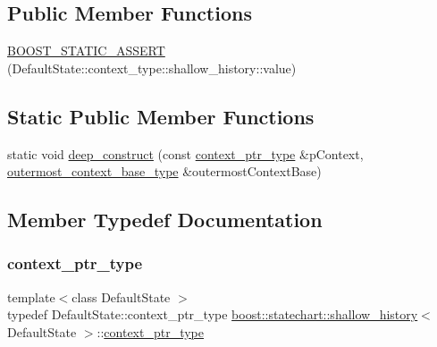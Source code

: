 \subsection*{Public Member Functions}
\begin{DoxyCompactItemize}
\item 
\mbox{\hyperlink{classboost_1_1statechart_1_1shallow__history_a52c6d3296a0c63266044bf135a9cc5e3}{B\+O\+O\+S\+T\+\_\+\+S\+T\+A\+T\+I\+C\+\_\+\+A\+S\+S\+E\+RT}} (Default\+State\+::context\+\_\+type\+::shallow\+\_\+history\+::value)
\end{DoxyCompactItemize}
\subsection*{Static Public Member Functions}
\begin{DoxyCompactItemize}
\item 
static void \mbox{\hyperlink{classboost_1_1statechart_1_1shallow__history_af903cba949c3ff7becebca038e27cef6}{deep\+\_\+construct}} (const \mbox{\hyperlink{classboost_1_1statechart_1_1shallow__history_a6433a73f2c4b7e7c42e2e2618c0ff784}{context\+\_\+ptr\+\_\+type}} \&p\+Context, \mbox{\hyperlink{classboost_1_1statechart_1_1shallow__history_a26036d97ce8fe35752f8397c63673f21}{outermost\+\_\+context\+\_\+base\+\_\+type}} \&outermost\+Context\+Base)
\end{DoxyCompactItemize}


\subsection{Member Typedef Documentation}
\mbox{\label{classboost_1_1statechart_1_1shallow__history_a6433a73f2c4b7e7c42e2e2618c0ff784}} 
\subsubsection{\texorpdfstring{context\+\_\+ptr\+\_\+type}{context\_ptr\_type}}
{\footnotesize\ttfamily template$<$class Default\+State $>$ \\
typedef Default\+State\+::context\+\_\+ptr\+\_\+type \mbox{\hyperlink{classboost_1_1statechart_1_1shallow__history}{boost\+::statechart\+::shallow\+\_\+history}}$<$ Default\+State $>$\+::\mbox{\hyperlink{classboost_1_1statechart_1_1shallow__history_a6433a73f2c4b7e7c42e2e2618c0ff784}{context\+\_\+ptr\+\_\+type}}}

